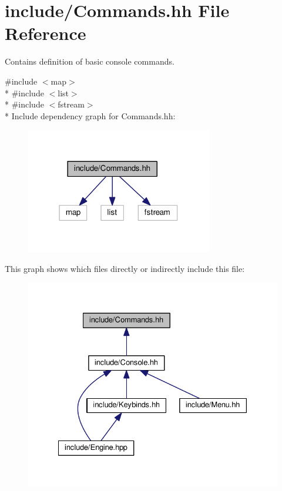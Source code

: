 \hypertarget{Commands_8hh}{}\section{include/\+Commands.hh File Reference}
\label{Commands_8hh}


Contains definition of basic console commands.  


{\ttfamily \#include $<$map$>$}\\*
{\ttfamily \#include $<$list$>$}\\*
{\ttfamily \#include $<$fstream$>$}\\*
Include dependency graph for Commands.\+hh\+:\nopagebreak
\begin{figure}[H]
\begin{center}
\leavevmode
\includegraphics[width=231pt]{Commands_8hh__incl}
\end{center}
\end{figure}
This graph shows which files directly or indirectly include this file\+:\nopagebreak
\begin{figure}[H]
\begin{center}
\leavevmode
\includegraphics[width=328pt]{Commands_8hh__dep__incl}
\end{center}
\end{figure}
